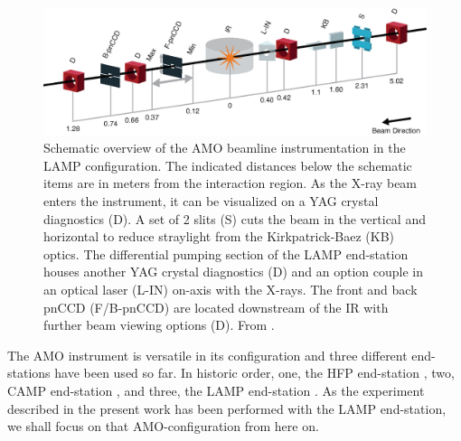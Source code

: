 \begin{figure}
	\centering
		\includegraphics[width=1.00\textwidth]{images/beam_layout.eps}
	\caption[Schematic overview of the AMO beamline instrumentation.]{Schematic overview of the AMO beamline instrumentation in the LAMP configuration. The indicated distances below the schematic items are in meters from the interaction region. As the X-ray beam enters the instrument, it can be visualized on a YAG crystal diagnostics (D). A set of 2 slits (S) cuts the beam in the vertical and horizontal to reduce straylight from the Kirkpatrick-Baez (KB) optics. The differential pumping section of the LAMP end-station houses another YAG crystal diagnostics (D) and an option couple in an optical laser (L-IN) on-axis with the X-rays. The front and back pnCCD (F/B-pnCCD) are located downstream of the IR with further beam viewing options (D). From \citep{Ferguson-2015-JSR}.}
	\label{fig:beam_layout}
\end{figure}
The AMO instrument is versatile in its configuration and three different end-stations have been used so far. In historic order, one, the HFP end-station \citep{Bozek-2009-EPJST,Bostedt-2013-JPB}, two, CAMP end-station \citep{Strueder-2010-NIMPA}, and three, the LAMP end-station \citep{Ferguson-2015-JSR,Bucher-2016-Unpublished}. As the experiment described in the present work has been performed with the LAMP end-station, we shall focus on that AMO-configuration from here on.\\[1\baselineskip]
%
